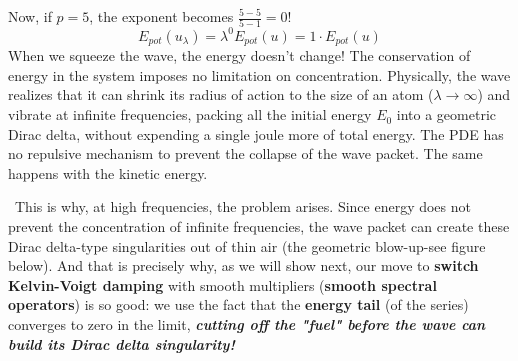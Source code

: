\documentclass[11pt,letterpaper]{amsart}
\begin{document}
Now, if $p = 5$, the exponent becomes $\frac{5-5}{5-1} = 0$!
$$E_{pot}(u_\lambda) = \lambda^0 E_{pot}(u) = 1 \cdot E_{pot}(u)$$
When we squeeze the wave, the energy doesn't change! The conservation of energy in the system imposes no limitation on concentration.
Physically, the wave realizes that it can shrink its radius of action to the size of an atom ($\lambda \to \infty$) and vibrate at infinite frequencies, packing all the initial energy $E_0$ into a geometric Dirac delta, without expending a single joule more of total energy. The PDE has no repulsive mechanism to prevent the collapse of the wave packet. The same happens with the kinetic energy.

~This is why, at high frequencies, the problem arises. Since energy does not prevent the concentration of infinite frequencies, the wave packet can create these Dirac delta-type singularities out of thin air (the geometric blow-up-see figure below).
And that is precisely why, as we will show next, our move to {\bf switch Kelvin-Voigt damping} with smooth multipliers ({\bf smooth spectral operators}) is so good: we use the fact that the {\bf energy tail} (of the series) converges to zero in the limit, {\bf \em cutting off the "fuel" before the wave can build its Dirac delta singularity!}
\end{document}
